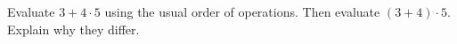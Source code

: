 Evaluate $3+4\cdot5$ using the usual order of operations. Then evaluate $(3+4)\cdot5$. Explain why they differ.
